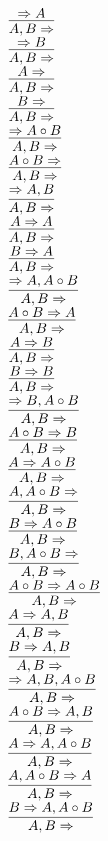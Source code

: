\documentclass[11pt]{article}
\begin{document}
\begin{center}
\bigskip
\\$\infer{A, B\Rightarrow }{\Rightarrow A}$
\bigskip
\\$\infer{A, B\Rightarrow }{\Rightarrow B}$
\bigskip
\\$\infer{A, B\Rightarrow }{A\Rightarrow }$
\bigskip
\\$\infer{A, B\Rightarrow }{B\Rightarrow }$
\bigskip
\\$\infer{A, B\Rightarrow }{\Rightarrow A\circ B}$
\bigskip
\\$\infer{A, B\Rightarrow }{A\circ B\Rightarrow }$
\bigskip
\\$\infer{A, B\Rightarrow }{\Rightarrow A, B}$
\bigskip
\\$\infer{A, B\Rightarrow }{A\Rightarrow A}$
\bigskip
\\$\infer{A, B\Rightarrow }{B\Rightarrow A}$
\bigskip
\\$\infer{A, B\Rightarrow }{\Rightarrow A, A\circ B}$
\bigskip
\\$\infer{A, B\Rightarrow }{A\circ B\Rightarrow A}$
\bigskip
\\$\infer{A, B\Rightarrow }{A\Rightarrow B}$
\bigskip
\\$\infer{A, B\Rightarrow }{B\Rightarrow B}$
\bigskip
\\$\infer{A, B\Rightarrow }{\Rightarrow B, A\circ B}$
\bigskip
\\$\infer{A, B\Rightarrow }{A\circ B\Rightarrow B}$
\bigskip
\\$\infer{A, B\Rightarrow }{A\Rightarrow A\circ B}$
\bigskip
\\$\infer{A, B\Rightarrow }{A, A\circ B\Rightarrow }$
\bigskip
\\$\infer{A, B\Rightarrow }{B\Rightarrow A\circ B}$
\bigskip
\\$\infer{A, B\Rightarrow }{B, A\circ B\Rightarrow }$
\bigskip
\\$\infer{A, B\Rightarrow }{A\circ B\Rightarrow A\circ B}$
\bigskip
\\$\infer{A, B\Rightarrow }{A\Rightarrow A, B}$
\bigskip
\\$\infer{A, B\Rightarrow }{B\Rightarrow A, B}$
\bigskip
\\$\infer{A, B\Rightarrow }{\Rightarrow A, B, A\circ B}$
\bigskip
\\$\infer{A, B\Rightarrow }{A\circ B\Rightarrow A, B}$
\bigskip
\\$\infer{A, B\Rightarrow }{A\Rightarrow A, A\circ B}$
\bigskip
\\$\infer{A, B\Rightarrow }{A, A\circ B\Rightarrow A}$
\bigskip
\\$\infer{A, B\Rightarrow }{B\Rightarrow A, A\circ B}$

\end{center}
\end{document}
